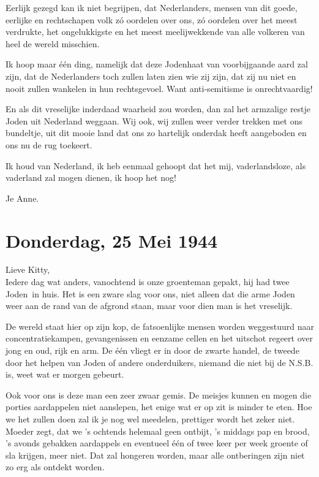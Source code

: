 \documentclass{book}
\begin{document}
Eerlijk gezegd kan ik niet begrijpen, dat Nederlanders, mensen van dit goede,
eerlijke en rechtschapen volk zó oordelen over ons, zó oordelen over het meest
verdrukte, het ongelukkigste en het meest meelijwekkende van alle volkeren van
heel de wereld misschien.

Ik hoop maar één ding, namelijk dat deze Jodenhaat van voorbijgaande aard zal
zijn, dat de Nederlanders toch zullen laten zien wie zij zijn, dat zij nu niet
en nooit zullen wankelen in hun rechtsgevoel. Want anti-semitisme is
onrechtvaardig!

En als dit vreselijke inderdaad waarheid zou worden, dan zal het armzalige
restje Joden uit Nederland weggaan. Wij ook, wij zullen weer verder trekken met
ons bundeltje, uit dit mooie land dat ons zo hartelijk onderdak heeft aangeboden
en ons nu de rug toekeert.

Ik houd van Nederland, ik heb eenmaal gehoopt dat het mij, vaderlandsloze, als
vaderland zal mogen dienen, ik hoop het nog!

Je Anne.

\section*{Donderdag, 25 Mei 1944}

Lieve Kitty,\\
Iedere dag wat anders, vanochtend is onze groenteman gepakt, hij
had twee Joden~in huis. Het is een zware slag voor ons, niet alleen dat die arme
Joden weer aan de rand van de afgrond staan, maar voor dien man is het
vreselijk.

De wereld staat hier op zijn kop, de fatsoenlijke mensen worden weggestuurd naar
concentratiekampen, gevangenissen en eenzame cellen en het uitschot regeert over
jong en oud, rijk en arm. De één vliegt er in door de zwarte handel, de tweede
door het helpen van Joden of andere onderduikers, niemand die niet bij de N.S.B.
is, weet wat er morgen gebeurt.

Ook voor ons is deze man een zeer zwaar gemis. De meisjes kunnen en mogen die
porties aardappelen niet aanslepen, het enige wat er op zit is minder te eten.
Hoe we het zullen doen zal ik je nog wel meedelen, prettiger wordt het zeker
niet. Moeder zegt, dat we 's ochtends helemaal geen ontbijt, 's middags pap en
brood, 's avonds gebakken aardappels en eventueel één of twee keer per week
groente of sla krijgen, meer niet.  Dat zal hongeren worden, maar alle
ontberingen zijn niet zo erg als ontdekt worden.
\end{document}
